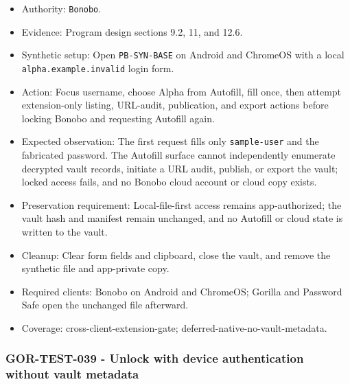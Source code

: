 \documentclass[
  letterpaper,
]{article}
\newcommand{\passthrough}[1]{#1}
\providecommand{\tightlist}{%
  \setlength{\itemsep}{0pt}\setlength{\parskip}{0pt}}
\begin{document}
\begin{itemize}
\tightlist
\item
  Authority: \passthrough{\lstinline!Bonobo!}.
\item
  Evidence: Program design sections 9.2, 11, and 12.6.
\item
  Synthetic setup: Open \nolinkurl{PB-SYN-BASE} on Android and ChromeOS with a local \nolinkurl{alpha.example.invalid}
  login form.
\item
  Action: Focus username, choose Alpha from Autofill, fill once, then attempt extension-only listing, URL-audit,
  publication, and export actions before locking Bonobo and requesting Autofill again.
\item
  Expected observation: The first request fills only \nolinkurl{sample-user} and the fabricated password. The Autofill
  surface cannot independently enumerate decrypted vault records, initiate a URL audit, publish, or export the vault;
  locked access fails, and no Bonobo cloud account or cloud copy exists.
\item
  Preservation requirement: Local-file-first access remains app-authorized; the vault hash and manifest remain
  unchanged, and no Autofill or cloud state is written to the vault.
\item
  Cleanup: Clear form fields and clipboard, close the vault, and remove the synthetic file and app-private copy.
\item
  Required clients: Bonobo on Android and ChromeOS; Gorilla and Password Safe open the unchanged file afterward.
\item
  Coverage: cross-client-extension-gate; deferred-native-no-vault-metadata.
\end{itemize}

\subsubsection{GOR-TEST-039 - Unlock with device authentication without vault
metadata}\label{gor-test-039---unlock-with-device-authentication-without-vault-metadata}
\end{document}

